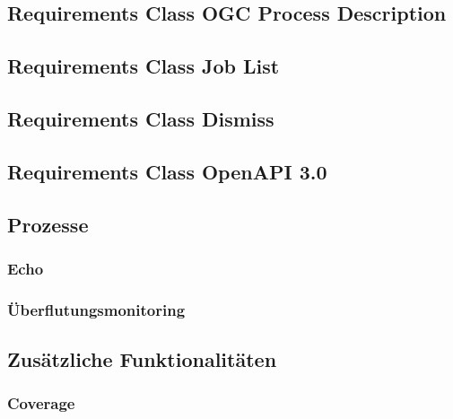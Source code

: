 \subsection{Requirements Class OGC Process Description}
\subsection{Requirements Class Job List}
\subsection{Requirements Class Dismiss}
\subsection{Requirements Class OpenAPI 3.0}
\subsection{Prozesse}
\subsubsection{Echo}
\subsubsection{Überflutungsmonitoring}
\subsection{Zusätzliche Funktionalitäten}
\subsubsection{Coverage} 